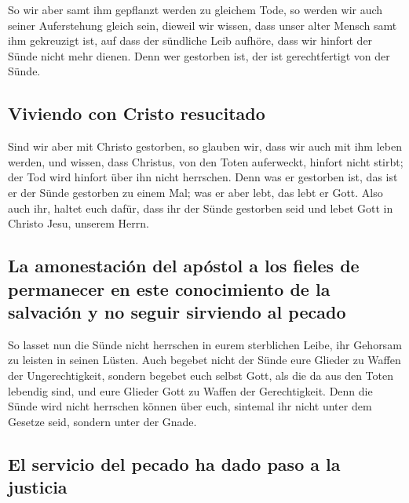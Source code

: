  So wir aber samt ihm gepflanzt werden zu gleichem Tode,
so werden wir auch seiner Auferstehung gleich sein, 
dieweil wir wissen, dass unser alter Mensch samt ihm gekreuzigt ist, auf
dass der sündliche Leib aufhöre, dass wir hinfort der Sünde nicht mehr
dienen.  Denn wer gestorben ist, der ist gerechtfertigt
von der Sünde.

\hypertarget{viviendo-con-cristo-resucitado}{%
\subsection{Viviendo con Cristo
resucitado}\label{viviendo-con-cristo-resucitado}}

 Sind wir aber mit Christo gestorben, so glauben wir, dass
wir auch mit ihm leben werden,  und wissen, dass Christus,
von den Toten auferweckt, hinfort nicht stirbt; der Tod wird hinfort
über ihn nicht herrschen.  Denn was er gestorben ist, das
ist er der Sünde gestorben zu einem Mal; was er aber lebt, das lebt er
Gott.  Also auch ihr, haltet euch dafür, dass ihr der
Sünde gestorben seid und lebet Gott in Christo Jesu, unserem Herrn.

\hypertarget{la-amonestaciuxf3n-del-apuxf3stol-a-los-fieles-de-permanecer-en-este-conocimiento-de-la-salvaciuxf3n-y-no-seguir-sirviendo-al-pecado}{%
\subsection{La amonestación del apóstol a los fieles de permanecer en
este conocimiento de la salvación y no seguir sirviendo al
pecado}\label{la-amonestaciuxf3n-del-apuxf3stol-a-los-fieles-de-permanecer-en-este-conocimiento-de-la-salvaciuxf3n-y-no-seguir-sirviendo-al-pecado}}

 So lasset nun die Sünde nicht herrschen in eurem
sterblichen Leibe, ihr Gehorsam zu leisten in seinen Lüsten.
 Auch begebet nicht der Sünde eure Glieder zu Waffen der
Ungerechtigkeit, sondern begebet euch selbst Gott, als die da aus den
Toten lebendig sind, und eure Glieder Gott zu Waffen der Gerechtigkeit.
 Denn die Sünde wird nicht herrschen können über euch,
sintemal ihr nicht unter dem Gesetze seid, sondern unter der Gnade.

\hypertarget{el-servicio-del-pecado-ha-dado-paso-a-la-justicia}{%
\subsection{El servicio del pecado ha dado paso a la
justicia}\label{el-servicio-del-pecado-ha-dado-paso-a-la-justicia}}

